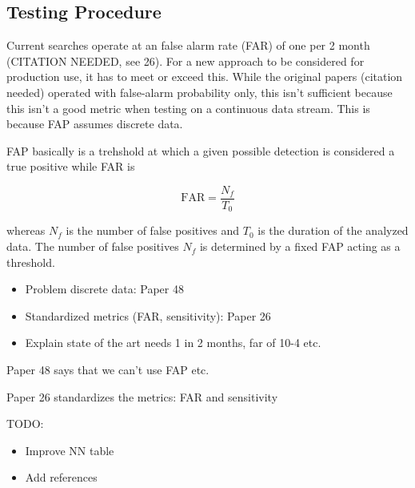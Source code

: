 \subsection{Testing Procedure}
Current searches operate at an false alarm rate (FAR) of one per 2 month
(CITATION NEEDED, see 26). For a new approach to be considered for production
use, it has to meet or exceed this. While the original papers (citation needed)
operated with false-alarm probability only, this isn't sufficient because this
isn't a good metric when testing on a continuous data stream. This is because
FAP assumes discrete data.

FAP basically is a trehshold at which a given possible detection is considered
a true positive while FAR is 

\[
  \text{FAR} = \frac{N_f}{T_0}
\]

whereas $N_f$ is the number of false positives and $T_0$ is the duration of the
analyzed data. The number of false positives $N_f$ is determined by a fixed
FAP acting as a threshold.






\begin{itemize}
  \item Problem discrete data: Paper 48
  \item Standardized metrics (FAR, sensitivity): Paper 26
  \item Explain state of the art needs 1 in 2 months, far of 10-4 etc.
\end{itemize}
Paper 48 says that we can't use FAP etc.

Paper 26 standardizes the metrics: FAR and sensitivity

TODO:
\begin{itemize}
  \item Improve NN table
  \item Add references
\end{itemize}
